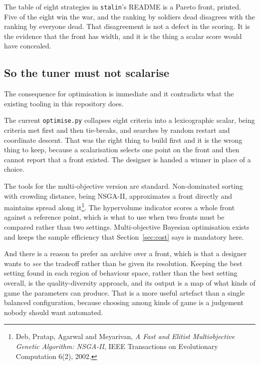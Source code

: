 \documentclass[11pt,a4paper]{article}
\begin{document}
\begin{sectionbox}
The table of eight strategies in \texttt{stalin}'s README is a Pareto front, printed. Five of the
eight win the war, and the ranking by soldiers dead disagrees with the ranking by everyone dead.
That disagreement is not a defect in the scoring. It is the evidence that the front has width,
and it is the thing a scalar score would have concealed.
\end{sectionbox}

\subsection{So the tuner must not scalarise}

The consequence for optimisation is immediate and it contradicts what the existing tooling in
this repository does.

The current \texttt{optimise.py} collapses eight criteria into a lexicographic scalar, being
criteria met first and then tie-breaks, and searches by random restart and coordinate descent. That
was the right thing to build first and it is the wrong thing to keep, because a scalarisation
selects one point on the front and then cannot report that a front existed. The designer is handed
a winner in place of a choice.

The tools for the multi-objective version are standard. Non-dominated sorting with crowding
distance, being NSGA-II, approximates a front directly and maintains spread along
it\footnote{Deb, Pratap, Agarwal and Meyarivan, \emph{A Fast and Elitist Multiobjective Genetic
Algorithm: NSGA-II}, IEEE Transactions on Evolutionary Computation 6(2), 2002.}. The hypervolume
indicator scores a whole front against a reference point, which is what to use when two fronts
must be compared rather than two settings. Multi-objective Bayesian optimisation exists and keeps
the sample efficiency that Section~\ref{sec:cost} says is mandatory here.

\begin{sectionbox}
And there is a reason to prefer an archive over a front, which is that a designer wants to
\emph{see} the tradeoff rather than be given its resolution. Keeping the best setting found in
each region of behaviour space, rather than the best setting overall, is the quality-diversity
approach, and its output is a map of what kinds of game the parameters can produce. That is a more
useful artefact than a single balanced configuration, because choosing among kinds of game is a
judgement nobody should want automated.
\end{sectionbox}
\end{document}
